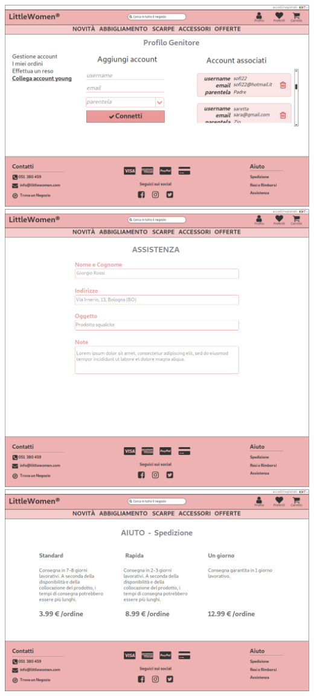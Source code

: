 \documentclass[12pt,a4paper]{report}
\begin{document}
\includegraphics[width=\textwidth]{"Project Management Sources/Wireframe/WireFrame Screenshot/Desktop/19 - Profilo Collega Account"}
\includegraphics[width=\textwidth]{"Project Management Sources/Wireframe/WireFrame Screenshot/Desktop/20 - Assistenza"}
\includegraphics[width=\textwidth]{"Project Management Sources/Wireframe/WireFrame Screenshot/Desktop/21 - Modalita di Spedizione"}
\end{document}
